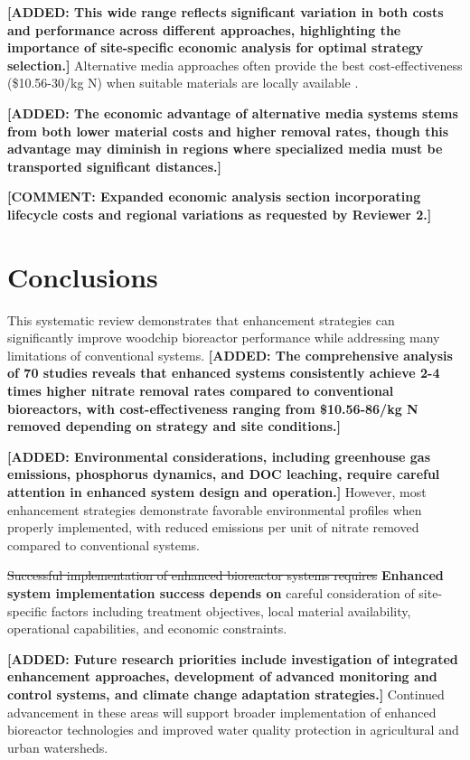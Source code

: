 \documentclass[12pt,a4paper]{article}
\newcommand{\added}[1]{\textcolor{addedtext}{\textbf{[ADDED: #1]}}}
\newcommand{\replaced}[2]{\textcolor{deletedtext}{\sout{#1}} \textcolor{replacedtext}{\textbf{#2}}}
\newcommand{\comment}[1]{\textcolor{commenttext}{\textbf{[COMMENT: #1]}}}
\begin{document}
\added{This wide range reflects significant variation in both costs and performance across different approaches, highlighting the importance of site-specific economic analysis for optimal strategy selection.} Alternative media approaches often provide the best cost-effectiveness (\$10.56-30/kg N) when suitable materials are locally available \citep{RN196, RN289}.

\added{The economic advantage of alternative media systems stems from both lower material costs and higher removal rates, though this advantage may diminish in regions where specialized media must be transported significant distances.}

\comment{Expanded economic analysis section incorporating lifecycle costs and regional variations as requested by Reviewer 2.}

\section{Conclusions}

This systematic review demonstrates that enhancement strategies can significantly improve woodchip bioreactor performance while addressing many limitations of conventional systems. \added{The comprehensive analysis of 70 studies reveals that enhanced systems consistently achieve 2-4 times higher nitrate removal rates compared to conventional bioreactors, with cost-effectiveness ranging from \$10.56-86/kg N removed depending on strategy and site conditions.}

\added{Environmental considerations, including greenhouse gas emissions, phosphorus dynamics, and DOC leaching, require careful attention in enhanced system design and operation.} However, most enhancement strategies demonstrate favorable environmental profiles when properly implemented, with reduced emissions per unit of nitrate removed compared to conventional systems.

\replaced{Successful implementation of enhanced bioreactor systems requires}{Enhanced system implementation success depends on} careful consideration of site-specific factors including treatment objectives, local material availability, operational capabilities, and economic constraints.

\added{Future research priorities include investigation of integrated enhancement approaches, development of advanced monitoring and control systems, and climate change adaptation strategies.} Continued advancement in these areas will support broader implementation of enhanced bioreactor technologies and improved water quality protection in agricultural and urban watersheds.
\end{document}
